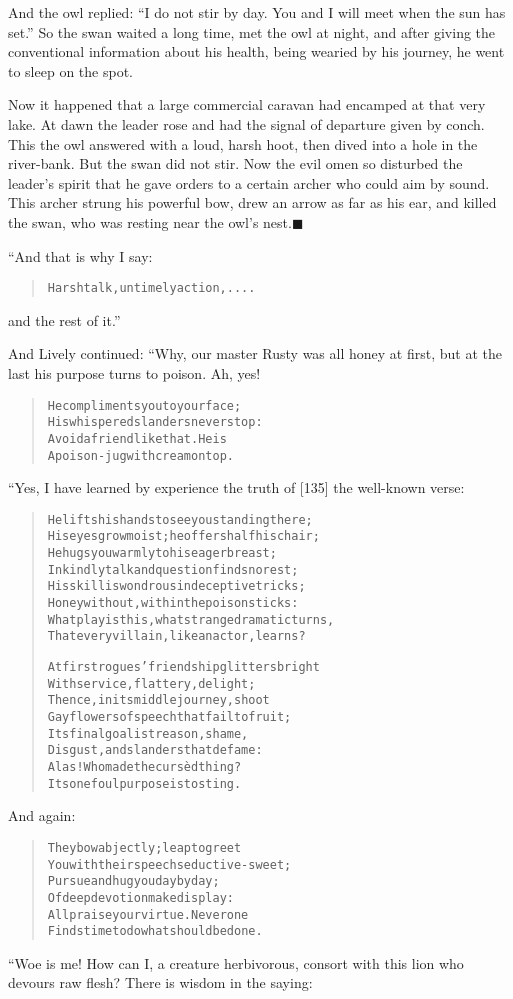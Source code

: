 \documentclass[article, twoside, 14pt]{memoir}
\newcommand{\qed}{\hfill \ensuremath{\blacksquare}}
\renewenvironment{verbatim}{%
\begin{quote}%
\vskip -10pt%
\begin{alltt}\normalfont\large}{\end{alltt}%
\end{quote}%
\vskip -10pt
} %
\begin{document}
And the owl replied:
``I do not stir by day. You and I will meet when the sun has set.''
So the swan waited a long time, met the owl at night, and after
giving the conventional information about his health, being wearied
by his journey, he went to sleep on the spot.

Now it happened that a large commercial caravan had encamped at
that very lake. At dawn the leader rose and had the signal of
departure given by conch. This the owl answered with a loud, harsh
hoot, then dived into a hole in the river-bank. But the swan did
not stir. Now the evil omen so disturbed the leader's spirit that
he gave orders to a certain archer who could aim by sound. This
archer strung his powerful bow, drew an arrow as far as his ear,
and killed the swan, who was resting near the owl's
nest.\hyperref[s15]{\qed}

“And that is why I say:

\begin{verbatim}
Harsh talk, untimely action,....
\end{verbatim}
and the rest of it.”

And Lively continued: “Why, our master Rusty was all honey at
first, but at the last his purpose turns to poison. Ah, yes!

\begin{verbatim}
He compliments you to your face;
    His whispered slanders never stop:
Avoid a friend like that. He is
    A poison-jug with cream on top.
\end{verbatim}
“Yes, I have learned by experience the truth of [135] the
well-known verse:

\begin{verbatim}
He lifts his hands to see you standing there;
His eyes grow moist; he offers half his chair;
He hugs you warmly to his eager breast;
In kindly talk and question finds no rest;
His skill is wondrous in deceptive tricks;
Honey without, within the poison sticks:
What play is this, what strange dramatic turns,
That every villain, like an actor, learns?

At first rogues' friendship glitters bright
With service, flattery, delight;
Thence, in its middle journey, shoot
Gay flowers of speech that fail to fruit;
Its final goal is treason, shame,
Disgust, and slanders that defame:
Alas! Who made the cursèd thing?
Its one foul purpose is to sting.
\end{verbatim}
And again:

\begin{verbatim}
They bow abjectly; leap to greet
You with their speech seductive-sweet;
Pursue and hug you day by day;
Of deep devotion make display:
All praise your virtue. Never one
Finds time to do what should be done.
\end{verbatim}
“Woe is me! How can I, a creature herbivorous, consort with this
lion who devours raw flesh? There is wisdom in the saying:
\end{document}
